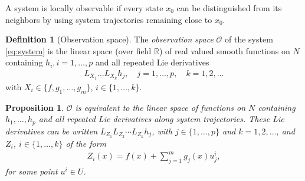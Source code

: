 \documentclass[psamsfonts]{amsart}
\newtheorem{prop}[thm]{Proposition}
\theoremstyle{definition}
\newtheorem{defn}[thm]{Definition}
\theoremstyle{remark}
\newcommand*\R{\mathds{R}}
\numberwithin{equation}{section}
\begin{document}
A system is locally observable if every state $x_0$ can be distinguished from its neighbors by using system trajectories remaining close to $x_0$. 

\begin{defn}[Observation space]
    The \textit{observation space} $\mathscr{O}$ of the system \eqref{eq:system} is the linear space (over field $\R$) of real valued smooth functions on $N$ containing $h_i, i = 1, \dots, p$ and all repeated Lie derivatives 
    \begin{align}
        L_{X_1}\dots L_{X_k}h_j, \quad j = 1,\dots, p, \quad k = 1,2, \dots
    \end{align}
    with $X_i \in \{f, g_1, \dots, g_m\}$, $i\in\{1, \dots, k\}$. 
\end{defn}

\begin{prop}
$\mathscr{O}$ is equivalent to the linear space of functions on $N$ containing $h_1, \dots, h_p$ and all repeated Lie derivatives along system trajectories. These Lie derivatives can be written $L_{Z_1}L_{Z_2}\cdots L_{Z_k}h_j$, with $j \in \{1, \dots, p\}$ and $k=1, 2, \dots$, and $Z_i$, $i\in \{1, \dots, k\}$ of the form
\begin{align}
Z_i(x) = f(x) + \sum_{j = 1}^{m}g_j(x)u_j^i, 
\end{align} 
for some point $u^i \in U$. 
\end{prop}




\end{document}

